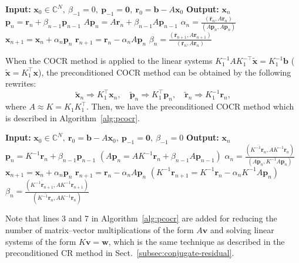 \begin{algorithm}[H]\caption{{The COCR method (note: $(\bar{\bm a},\bm b)=\bm a^{\top}\bm b$)}}\label{alg:cocr}\begin{algorithmic}[1]
\Statex\textbf{Input:} $\bm x_0\in\mathbb C^N,\ \beta_{-1}=0,\ \bm p_{-1}=\bm0,\ \bm r_0=\bm b-A\bm x_0$
\Statex\textbf{Output:} $\bm x_n$
\State $\bm p_n=\bm r_n+\beta_{n-1}\bm p_{n-1}$
\State $A\bm p_n=A\bm r_n+\beta_{n-1}A\bm p_{n-1}$
\State $\alpha_n=\frac{(\bar{\bm r}_n,A\bm r_n)}{(\overline{A\bm p_n},A\bm p_n)}$
\State $\bm x_{n+1}=\bm x_n+\alpha_n\bm p_n$
\State $\bm r_{n+1}=\bm r_n-\alpha_nA\bm p_n$
\State $\beta_n=\frac{(\bar{\bm r}_{n+1},A\bm r_{n+1})}{(\bar{\bm r}_n,A\bm r_n)}$
\EndFor\end{algorithmic}\end{algorithm}
{When the COCR method is applied to the linear systems $K_1^{-1}AK_1^{-\top}\widetilde{\bm x}=K_1^{-1}\bm b$ ($\widetilde{\bm x}=K_1^{\top}\bm x$), the preconditioned COCR method can be obtained by the following rewrites:}
\[\widetilde{\bm x}_n\Rightarrow K_1^{\top}\bm x_n,\quad\widetilde{\bm p}_n\Rightarrow K_1^{\top}\bm p_n,\quad\widetilde{\bm r}_n\Rightarrow K_1^{-1}\bm r_n,\]
{where $A\approx K=K_1K_1^{\top}$. Then, we have the preconditioned COCR method which is described in Algorithm\ \ref{alg:pcocr}.}
\begin{algorithm}[H]\caption{{The preconditioned COCR method (note: $(\bar{\bm a},\bm b)=\bm a^{\top}\bm b$)}}\label{alg:pcocr}\begin{algorithmic}[1]
\Statex\textbf{Input:} $\bm x_0\in\mathbb C^N,\ \bm r_0=\bm b-A\bm x_0,\ \bm p_{-1}=\bm0,\ \beta_{-1}=0$
\Statex\textbf{Output:} $\bm x_n$
\State $\bm p_n=K^{-1}\bm r_n+\beta_{n-1}\bm p_{n-1}$
\State $(A\bm p_n=AK^{-1}\bm r_n+\beta_{n-1}A\bm p_{n-1})$
\State $\alpha_n=\frac{(\overline{K^{-1}\bm r_n},AK^{-1}\bm r_n)}{(\overline{A\bm p_n},K^{-1}A\bm p_n)}$
\State $\bm x_{n+1}=\bm x_n+\alpha_n\bm p_n$
\State $\bm r_{n+1}=\bm r_n-\alpha_nA\bm p_n$
\State $(K^{-1}\bm r_{n+1}=K^{-1}\bm r_n-\alpha_nK^{-1}A\bm p_n)$
\State $\beta_n=\frac{(\overline{K^{-1}\bm r_{n+1}},AK^{-1}\bm r_{n+1})}{(\overline{K^{-1}\bm r_n},AK^{-1}\bm r_n)}$
\EndFor\end{algorithmic}\end{algorithm}
{Note that lines 3 and 7 in Algorithm\ \ref{alg:pcocr} are added for reducing the number of matrix--vector multiplications of the form $A\bm v$ and solving linear systems of the form $K\bm v=\bm w$, which is the same technique as described in the preconditioned CR method in Sect.\ \ref{subsec:conjugate-residual}.}
